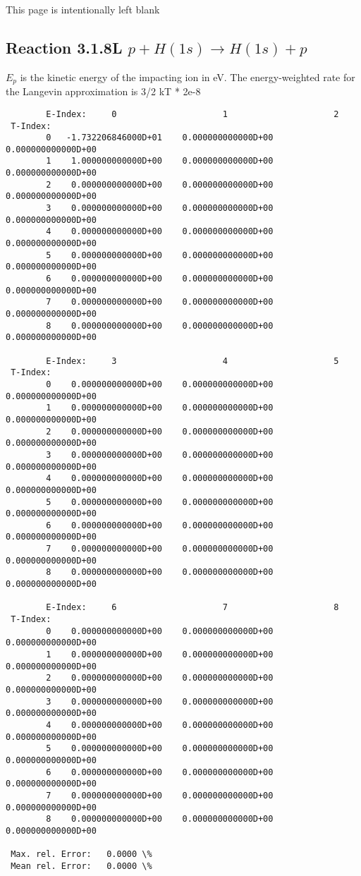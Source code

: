 \documentclass[12pt,dvipdfmx]{article}
\begin{document}
\newpage
This page is intentionally left blank
\newpage
\subsection{
Reaction 3.1.8L  $p + H(1s)  \rightarrow  H(1s) + p $
}
$E_p$ is the kinetic energy of the impacting ion in eV.
The energy-weighted rate for the Langevin approximation is
3/2 kT * 2e-8

\begin{small}\begin{verbatim}
        E-Index:     0                     1                     2
 T-Index:
        0   -1.732206846000D+01    0.000000000000D+00    0.000000000000D+00
        1    1.000000000000D+00    0.000000000000D+00    0.000000000000D+00
        2    0.000000000000D+00    0.000000000000D+00    0.000000000000D+00
        3    0.000000000000D+00    0.000000000000D+00    0.000000000000D+00
        4    0.000000000000D+00    0.000000000000D+00    0.000000000000D+00
        5    0.000000000000D+00    0.000000000000D+00    0.000000000000D+00
        6    0.000000000000D+00    0.000000000000D+00    0.000000000000D+00
        7    0.000000000000D+00    0.000000000000D+00    0.000000000000D+00
        8    0.000000000000D+00    0.000000000000D+00    0.000000000000D+00

        E-Index:     3                     4                     5
 T-Index:
        0    0.000000000000D+00    0.000000000000D+00    0.000000000000D+00
        1    0.000000000000D+00    0.000000000000D+00    0.000000000000D+00
        2    0.000000000000D+00    0.000000000000D+00    0.000000000000D+00
        3    0.000000000000D+00    0.000000000000D+00    0.000000000000D+00
        4    0.000000000000D+00    0.000000000000D+00    0.000000000000D+00
        5    0.000000000000D+00    0.000000000000D+00    0.000000000000D+00
        6    0.000000000000D+00    0.000000000000D+00    0.000000000000D+00
        7    0.000000000000D+00    0.000000000000D+00    0.000000000000D+00
        8    0.000000000000D+00    0.000000000000D+00    0.000000000000D+00

        E-Index:     6                     7                     8
 T-Index:
        0    0.000000000000D+00    0.000000000000D+00    0.000000000000D+00
        1    0.000000000000D+00    0.000000000000D+00    0.000000000000D+00
        2    0.000000000000D+00    0.000000000000D+00    0.000000000000D+00
        3    0.000000000000D+00    0.000000000000D+00    0.000000000000D+00
        4    0.000000000000D+00    0.000000000000D+00    0.000000000000D+00
        5    0.000000000000D+00    0.000000000000D+00    0.000000000000D+00
        6    0.000000000000D+00    0.000000000000D+00    0.000000000000D+00
        7    0.000000000000D+00    0.000000000000D+00    0.000000000000D+00
        8    0.000000000000D+00    0.000000000000D+00    0.000000000000D+00

 Max. rel. Error:   0.0000 \%
 Mean rel. Error:   0.0000 \%
\end{verbatim}\end{small}
\end{document}
